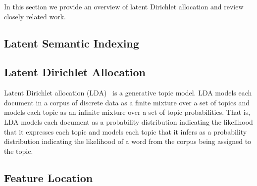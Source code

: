 
In this section we provide an overview of latent Dirichlet allocation and review closely related work.

\subsection{Latent Semantic Indexing}

\subsection{Latent Dirichlet Allocation}

Latent Dirichlet allocation (LDA)~\cite{Blei-etal:2003} is a generative topic model.
LDA models each document in a corpus of discrete data as a finite mixture over a set of topics
and models each topic as an infinite mixture over a set of topic probabilities.
That is, LDA models each document as a probability distribution
indicating the likelihood that it expresses each topic and
models each topic that it infers as a probability distribution
indicating the likelihood of a word from the corpus being assigned to the topic.



\subsection{Feature Location}

